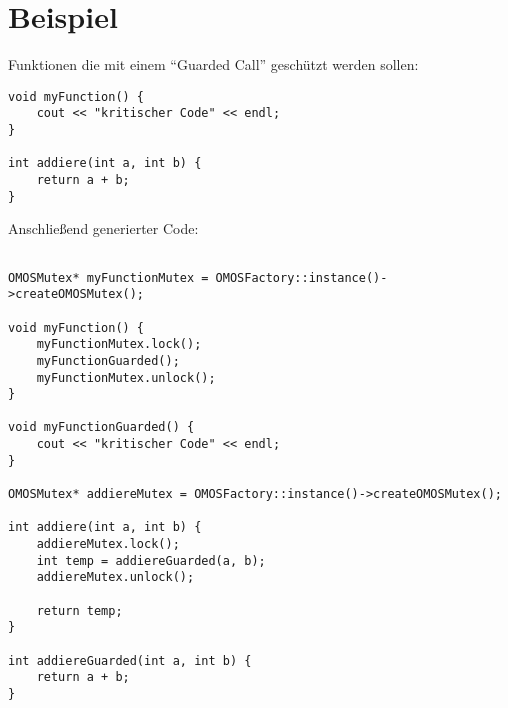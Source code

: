 \newpage

\section{Beispiel}

Funktionen die mit einem \enquote{Guarded Call} geschützt werden sollen:

\begin{lstlisting}
void myFunction() {
	cout << "kritischer Code" << endl;
}

int addiere(int a, int b) {
	return a + b;
}
\end{lstlisting}

Anschließend generierter Code:

 \begin{lstlisting}

OMOSMutex* myFunctionMutex = OMOSFactory::instance()->createOMOSMutex();

void myFunction() {
	myFunctionMutex.lock();
	myFunctionGuarded();
	myFunctionMutex.unlock();
}

void myFunctionGuarded() {
	cout << "kritischer Code" << endl;
}

OMOSMutex* addiereMutex = OMOSFactory::instance()->createOMOSMutex();

int addiere(int a, int b) {
	addiereMutex.lock();
	int temp = addiereGuarded(a, b);
	addiereMutex.unlock();

	return temp;
}

int addiereGuarded(int a, int b) {
	return a + b;
}

\end{lstlisting}